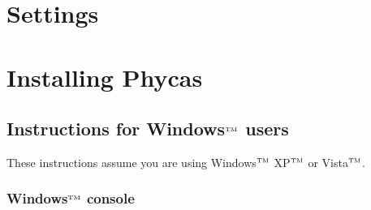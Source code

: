 \documentclass[10pt]{article}
\newcommand{\trademark}[1]{#1${}^{\mbox{\tiny TM}}$}
\begin{document}
\section{Settings}\label{sec:phycassettings}


\section{Installing Phycas}\label{sec:install}

\subsection{Instructions for \trademark{Windows} users} 

These instructions assume you are using \trademark{Windows} \trademark{XP} or \trademark{Vista}.

\subsubsection{\trademark{Windows} console} \label{subsubsec:winconsole}
\end{document}

